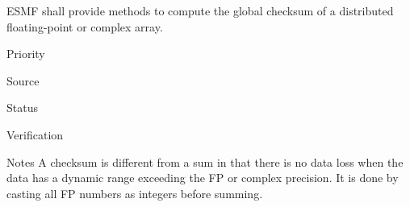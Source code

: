
ESMF shall provide methods to compute the global checksum of a
distributed floating-point or complex array. 

\begin{reqlist}
\item[Priority]
\item[Source]
\item[Status]
\item[Verification]
\item[Notes] A checksum is different from a sum in that there is no
  data loss when the data has a dynamic range exceeding the FP or
  complex precision. It is done by casting all FP numbers as integers
  before summing.
\end{reqlist}

%
%









